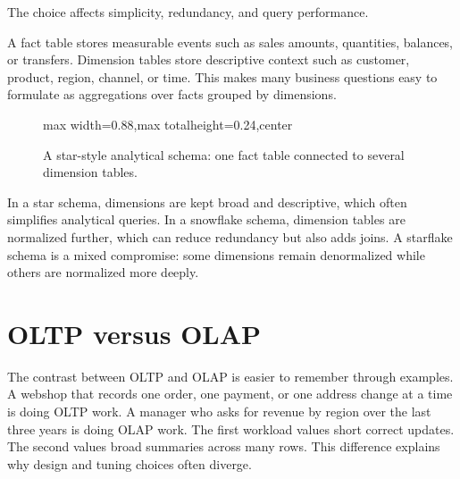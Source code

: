 \documentclass[11pt,a4paper,openany]{book}
\begin{document}
The choice affects simplicity, redundancy, and query performance.

A fact table stores measurable events such as sales amounts, quantities, balances, or transfers. Dimension tables store descriptive context such as customer, product, region, channel, or time. This makes many business questions easy to formulate as aggregations over facts grouped by dimensions.

\begin{figure}[tbp]
\centering
\begin{adjustbox}{max width=0.88\linewidth,max totalheight=0.24\textheight,center}
\end{adjustbox}
\caption{A star-style analytical schema: one fact table connected to several dimension tables.}
\label{fig:dw-star}
\end{figure}

In a star schema, dimensions are kept broad and descriptive, which often simplifies analytical queries. In a snowflake schema, dimension tables are normalized further, which can reduce redundancy but also adds joins. A starflake schema is a mixed compromise: some dimensions remain denormalized while others are normalized more deeply.

\section{OLTP versus OLAP}
The contrast between OLTP and OLAP is easier to remember through examples. A webshop that records one order, one payment, or one address change at a time is doing OLTP work. A manager who asks for revenue by region over the last three years is doing OLAP work. The first workload values short correct updates. The second values broad summaries across many rows. This difference explains why design and tuning choices often diverge.
\end{document}
